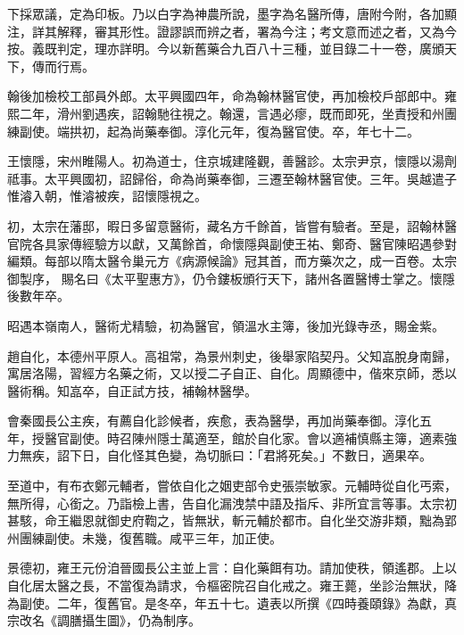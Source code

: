 \begin{pinyinscope}
 下採眾議，定為印板。乃以白字為神農所說，墨字為名醫所傳，唐附今附，各加顯
 注，詳其解釋，審其形性。證謬誤而辨之者，署為今注；考文意而述之者，又為今按。義既判定，理亦詳明。今以新舊藥合九百八十三種，並目錄二十一卷，廣頒天下，傳而行焉。



 翰後加檢校工部員外郎。太平興國四年，命為翰林醫官使，再加檢校戶部郎中。雍熙二年，滑州劉遇疾，詔翰馳往視之。翰還，言遇必瘳，既而即死，坐責授和州團練副使。端拱初，起為尚藥奉御。淳化元年，復為醫官使。卒，年七十二。



 王懷隱，宋州睢陽人。初為道士，住京城建隆觀，善醫診。太宗尹京，懷隱以湯劑祗事。太平興國初，詔歸俗，命為尚藥奉御，三遷至翰林醫官使。三年。吳越遣子惟濬入朝，惟濬被疾，詔懷隱視之。



 初，太宗在藩邸，暇日多留意醫術，藏名方千餘首，皆嘗有驗者。至是，詔翰林醫官院各具家傳經驗方以獻，又萬餘首，命懷隱與副使王祐、鄭奇、醫官陳昭遇參對編類。每部以隋太醫令巢元方《病源候論》冠其首，而方藥次之，成一百卷。太宗御製序，
 賜名曰《太平聖惠方》，仍令鏤板頒行天下，諸州各置醫博士掌之。懷隱後數年卒。



 昭遇本嶺南人，醫術尤精驗，初為醫官，領溫水主簿，後加光錄寺丞，賜金紫。



 趙自化，本德州平原人。高祖常，為景州刺史，後舉家陷契丹。父知嵓脫身南歸，寓居洛陽，習經方名藥之術，又以授二子自正、自化。周顯德中，偕來京師，悉以醫術稱。知嵓卒，自正試方技，補翰林醫學。



 會秦國長公主疾，有薦自化診候者，疾愈，表為醫學，再加尚藥奉御。淳化五
 年，授醫官副使。時召陳州隱士萬適至，館於自化家。會以適補慎縣主簿，適素強力無疾，詔下日，自化怪其色變，為切脈曰：「君將死矣。」不數日，適果卒。



 至道中，有布衣鄭元輔者，嘗依自化之姻吏部令史張崇敏家。元輔時從自化丐索，無所得，心銜之。乃詣檢上書，告自化漏洩禁中語及指斥、非所宜言等事。太宗初甚駭，命王繼恩就御史府鞫之，皆無狀，斬元輔於都市。自化坐交游非類，黜為郢州團練副使。未幾，復舊職。咸平三年，加正使。



 景德初，雍王元份洎晉國長公主並上言：自化藥餌有功。請加使秩，領遙郡。上以自化居太醫之長，不當復為請求，令樞密院召自化戒之。雍王薨，坐診治無狀，降為副使。二年，復舊官。是冬卒，年五十七。遺表以所撰《四時養頤錄》為獻，真宗改名《調膳攝生圖》，仍為制序。




\end{pinyinscope}
